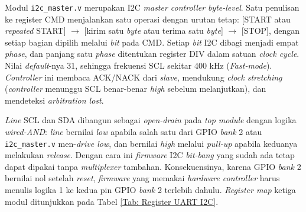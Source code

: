 Modul \texttt{i2c\_master.v} merupakan I2C \textit{master controller} \textit{byte-level}. Satu penulisan ke register CMD menjalankan satu operasi dengan urutan tetap: [START atau \textit{repeated} START] $\rightarrow$ [kirim satu \textit{byte} atau terima satu \textit{byte}] $\rightarrow$ [STOP], dengan setiap bagian dipilih melalui \textit{bit} pada CMD. Setiap \textit{bit} I2C dibagi menjadi empat \textit{phase}, dan panjang satu \textit{phase} ditentukan register DIV dalam satuan \textit{clock cycle}. Nilai \textit{default}-nya 31, sehingga frekuensi SCL sekitar 400 kHz (\textit{Fast-mode}). \textit{Controller} ini membaca ACK/NACK dari \textit{slave}, mendukung \textit{clock stretching} (\textit{controller} menunggu SCL benar-benar \textit{high} sebelum melanjutkan), dan mendeteksi \textit{arbitration lost}.

\textit{Line} SCL dan SDA dibangun sebagai \textit{open-drain} pada \textit{top module} dengan logika \textit{wired-AND}: \textit{line} bernilai \textit{low} apabila salah satu dari GPIO \textit{bank} 2 atau \texttt{i2c\_master.v} men-\textit{drive low}, dan bernilai \textit{high} melalui \textit{pull-up} apabila keduanya melakukan \textit{release}. Dengan cara ini \textit{firmware} I2C \textit{bit-bang} yang sudah ada tetap dapat dipakai tanpa \textit{multiplexer} tambahan. Konsekuensinya, karena GPIO \textit{bank} 2 bernilai nol setelah \textit{reset}, \textit{firmware} yang memakai \textit{hardware controller} harus menulis logika 1 ke kedua pin GPIO \textit{bank} 2 terlebih dahulu. \textit{Register map} ketiga modul ditunjukkan pada Tabel \ref{Tab: Register UART I2C}.

